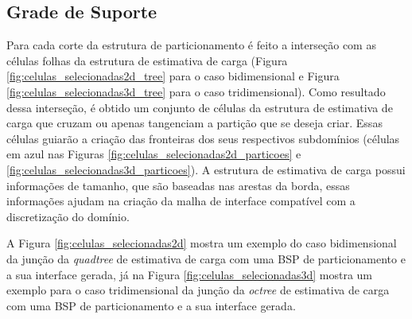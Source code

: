 \subsection{Grade de Suporte}

Para cada corte da estrutura de particionamento é feito a interseção com as células folhas da estrutura de estimativa de carga (Figura \ref{fig:celulas_selecionadas2d_tree} para o caso bidimensional e Figura \ref{fig:celulas_selecionadas3d_tree} para o caso tridimensional). Como resultado dessa interseção, é obtido um conjunto de células da estrutura de estimativa de carga que cruzam ou apenas tangenciam a partição que se deseja criar. Essas células guiarão a criação das fronteiras dos seus respectivos subdomínios (células em azul nas Figuras \ref{fig:celulas_selecionadas2d_particoes} e \ref{fig:celulas_selecionadas3d_particoes}). A estrutura de estimativa de carga possui informações de tamanho, que são baseadas nas arestas da borda, essas informações ajudam na criação da malha de interface compatível com a discretização do domínio.

A Figura \ref{fig:celulas_selecionadas2d} mostra um exemplo do caso bidimensional da junção da \textit{quadtree} de estimativa de carga com uma BSP de particionamento e a sua interface gerada, já na Figura \ref{fig:celulas_selecionadas3d} mostra um exemplo para o caso tridimensional da junção da \textit{octree} de estimativa de carga com uma BSP de particionamento e a sua interface gerada.

